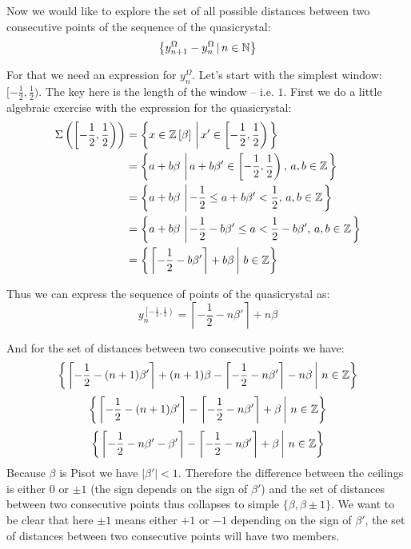 \documentclass[text.tex]{subfiles}
\begin{document}
Now we would like to explore the set of all possible distances between two consecutive points of the sequence of the quasicrystal: 
$$\left\{ y^\Omega_{n+1}-y^\Omega_{n}\,|\, n\in\mathbb{N} \right\}$$

For that we need an expression for $y^\Omega_n$. Let's start with the simplest window: $[-\frac{1}{2}, \frac{1}{2})$. The key here is the length of the window -- i.e. $1$. First we do a little algebraic exercise with the expression for the quasicrystal:
\begin{align*}
\Sigma\left(\left[-\frac{1}{2}, \frac{1}{2}\right)\right) &= \left\{x\in\ring\,\left|\, x'\in \left[-\frac{1}{2}, \frac{1}{2}\right)\right.\right\}\\%
 &= \left\{a+b\beta\,\left|\, a+b\beta'\in \left[-\frac{1}{2}, \frac{1}{2}\right),\,a,b\in\ZZ\right.\right\}\\%
  &= \left\{a+b\beta\,\left|\, -\frac{1}{2}\leq a+b\beta'<\frac{1}{2},\,a,b\in\ZZ\right.\right\}\\
  &= \left\{a+b\beta\,\left|\, -\frac{1}{2}-b\beta'\leq a < \frac{1}{2}-b\beta',\,a,b\in\ZZ\right.\right\}\\
  &= \left\{\left.\left\lceil-\frac{1}{2} -b\beta'\right\rceil + b\beta\,\right|\, b\in\ZZ\right\}\\
\end{align*}


Thus we can express the sequence of points of the quasicrystal as:
$$y^{\left[-\frac{1}{2}, \frac{1}{2}\right)}_n = \left\lceil-\frac{1}{2} -n\beta'\right\rceil + n\beta$$%

And for the set of distances between two consecutive points we have:
$$\left\{ \left.\left\lceil-\frac{1}{2} -(n+1)\beta'\right\rceil + (n+1)\beta - \left\lceil-\frac{1}{2} -n\beta'\right\rceil - n\beta \,\right|\, n\in\mathbb{Z}\right\}$$%
$$\left\{ \left.\left\lceil-\frac{1}{2} -(n+1)\beta'\right\rceil - \left\lceil-\frac{1}{2} -n\beta'\right\rceil + \beta \,\right|\, n\in\mathbb{Z}\right\}$$%
$$\left\{ \left.\left\lceil-\frac{1}{2} -n\beta' - \beta'\right\rceil - \left\lceil-\frac{1}{2} -n\beta'\right\rceil + \beta \,\right|\, n\in\mathbb{Z}\right\}$$%
Because $\beta$ is Pisot we have $|\beta'|<1$. Therefore the difference between the ceilings is either $0$ or $\pm1$ (the sign depends on the sign of $\beta'$) and the set of distances between two consecutive points thus collapses to simple $\{\beta, \beta \pm 1\}$. We want to be clear that here $\pm 1$ means either $+1$ or $-1$ depending on the sign of $\beta'$, the set of distances between two consecutive points will have two members. 
\end{document}

